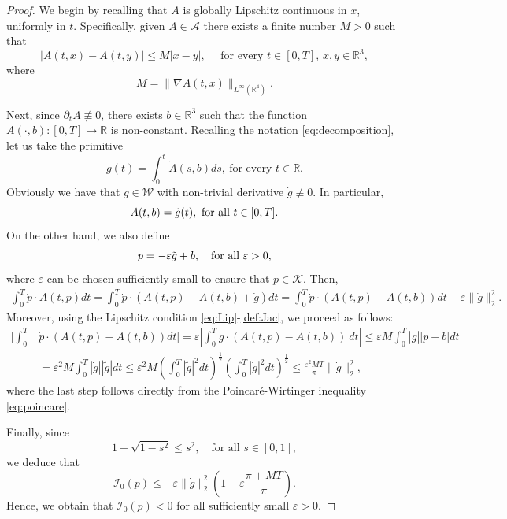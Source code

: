 \documentclass{article}
\newcommand{\boK}{\mathcal{K}}
\newcommand{\boI}{\mathcal{I}}
\newcommand{\R}{\mathbb{R}}
\newcommand{\boW}{\mathcal{W}}
\newcommand{\boA}{\mathcal{A}}
\newcommand{\dpp}{\dot{p}}
\theoremstyle{definition}
\begin{document}
\begin{proof}
We begin by recalling that $A$ is globally Lipschitz continuous in $x$, uniformly in $t$. Specifically, given $A\in\boA$ there exists a finite number $M>0$ such that
\begin{equation}\label{eq:Lip}
	|A(t,x)-A(t,y)|\leq M |x-y|,\quad\text{ for every }t\in [0,T],\, x,y\in\R^3,
\end{equation}
where
\begin{equation}\label{def:Jac}
	M=\|\nabla A(t,x)\|_{L^\infty(\R^4)}.
\end{equation}

Next, since $\partial_t A\not\equiv0$, there exists $b\in\R^3$ such that the function $A(\cdot,b):[0,T]\to\R$ is non-constant. Recalling the notation \eqref{eq:decomposition}, let us take the primitive 
\begin{equation}\label{def:g(t)}
	g(t)=\int_0^t \tilde A(s,b) ds,\ \text{for every }t\in\R.
\end{equation}
Obviously we have that $g\in\boW$ with non-trivial derivative $\dot{g}\not\equiv 0$. In particular,
\begin{equation}\label{HypLemma}
   A(t,b)=\dot{g}(t),\hbox{ for all }t\in[0,T].
\end{equation}
On the other hand, we also define 
\begin{equation}\label{def:p-eps}
  p=-\varepsilon \tilde g + b,\quad\hbox{for all }\varepsilon>0,
\end{equation}
where $\varepsilon$ can be chosen sufficiently small to ensure that $p\in\boK$. Then,
\begin{align*}
    \int_0^T \dpp\cdot A(t,p) dt=\int_0^T\dpp\cdot\left(A(t,p)-A(t,b)+\dot{g}\right) dt=\int_0^T\dpp\cdot\left(A(t,p)-A(t,b)\right) dt-\varepsilon\|\dot{g}\|_2^2.
\end{align*}
Moreover, using the Lipschitz condition \eqref{eq:Lip}-\eqref{def:Jac}, we proceed as follows:
    \begin{align*}
        \Bigg|\int_0^T&\dpp\cdot(A(t,p) -A(t,b))dt\Bigg| = \varepsilon\left|\int_0^T \dot{g}\cdot\left(A(t,p)-A(t,b)\right)\ dt\right|\leq \varepsilon M\int_0^T |\dot{g}||p-b|dt
        \\
         &=\varepsilon^2M\int_0^T |\dot{g}||\tilde g|dt \leq \varepsilon^2M\left(\int_0^T |\tilde g|^2dt\right)^\frac12 \left(\int_0^T|\dot{g}|^2dt\right)^\frac12\leq \frac{\varepsilon^2MT}{\pi}\|\dot{g}\|_2^2,
    \end{align*}
where the last step follows directly from the Poincaré-Wirtinger inequality \eqref{eq:poincare}.

Finally, since
\begin{equation}\label{def:relativistic-ineq}
    1-\sqrt{1-s^2}\leq s^2,\quad \text{for all }s\in[0,1],
\end{equation}
    we deduce that
    \begin{equation}\label{ineq:epsilon1}
        \boI_0(p)\leq-\varepsilon\|\dot{g}\|_2^2   \left(1-\varepsilon\frac{\pi+MT}{\pi}\right).
    \end{equation}
  Hence, we obtain that $\boI_0(p)<0$ for all sufficiently small $\varepsilon>0$.
\end{proof}
\end{document}
